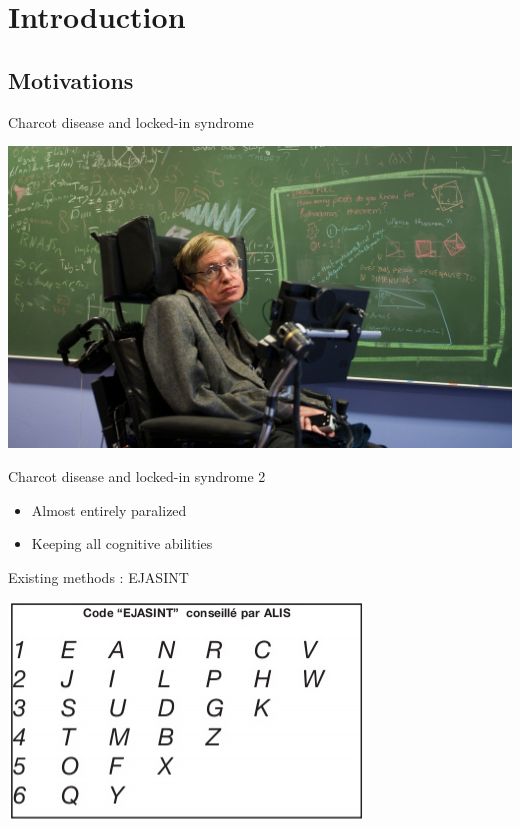 \documentclass[notes]{beamer}
\begin{document}
\section{Introduction}
\subsection{Motivations}

\begin{frame}{Charcot disease and locked-in syndrome}
	\begin{center}
		\includegraphics[scale=0.5]{hawking}
	\end{center}
\end{frame}

\begin{frame}{Charcot disease and locked-in syndrome 2}
	\begin{center}
		\begin{itemize}
			\item Almost entirely paralized
			\item Keeping all cognitive abilities
		\end{itemize}
	\end{center}
\end{frame}

\begin{frame}{Existing methods : EJASINT}
	\begin{center}
		\includegraphics[scale=0.7]{ejasint}
	\end{center}
\end{frame}
\end{document}

